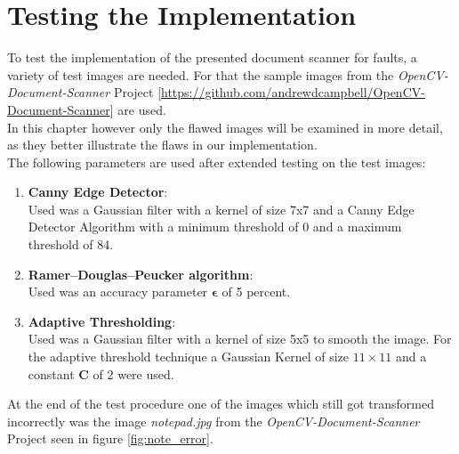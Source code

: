 \section{Testing the Implementation}

To test the implementation of the presented document scanner for faults, a variety of test images are needed. For that the sample images from the \textit{OpenCV-Document-Scanner} Project [\url{https://github.com/andrewdcampbell/OpenCV-Document-Scanner}] are used.\\
In this chapter however only the flawed images will be examined in more detail, as they better illustrate the flaws in our implementation.\\

The following parameters are used after extended testing on the test images:
\begin{enumerate}
    \item \textbf{Canny Edge Detector}:\\
    Used was a Gaussian filter with a kernel of size 7x7 and a Canny Edge Detector Algorithm with a minimum threshold of 0 and a maximum threshold of 84.
    \item \textbf{Ramer–Douglas–Peucker algorithm}:\\
    Used was an accuracy parameter {\large $\bm{\epsilon}$} of 5 percent.
    \item \textbf{Adaptive Thresholding}:\\
    Used was a Gaussian filter with a kernel of size 5x5 to smooth the image. For the adaptive threshold technique a Gaussian Kernel of size $11 \times 11$ and a constant \textbf{C} of 2 were used.
\end{enumerate}

At the end of the test procedure one of the images which still got transformed incorrectly was the image \textit{notepad.jpg} from the \textit{OpenCV-Document-Scanner} Project seen in figure \ref{fig:note_error}.


